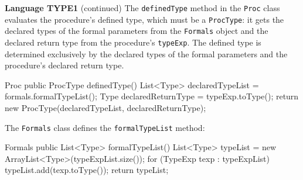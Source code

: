 \begin{minipage}[t]{\sw}
\slidenumber
\LARGE
{\bf Language TYPE1} (continued)\exx
\Large
The \verb'definedType' method in the \verb'Proc' class
evaluates the procedure's defined type, which must be a \verb'ProcType':
it gets the declared types of the formal parameters
from the \verb'Formals' object
and the declared return type
from the procedure's \verb'typeExp'.
The defined type is determined exclusively by the declared types
of the formal parameters and the procedure's declared return type.
\large
\begin{qv}
Proc
    public ProcType definedType() {
        List<Type> declaredTypeList = formals.formalTypeList();
        Type declaredReturnType = typeExp.toType();
        return new ProcType(declaredTypeList, declaredReturnType);
    }
\end{qv}
\Large
The \verb'Formals' class defines the \verb'formalTypeList' method:
\large
\begin{qv}
Formals
    public List<Type> formalTypeList() {
        List<Type> typeList = new ArrayList<Type>(typeExpList.size());
        for (TypeExp texp : typeExpList)
            typeList.add(texp.toType());
        return typeList;
    }
\end{qv}
\end{minipage}
